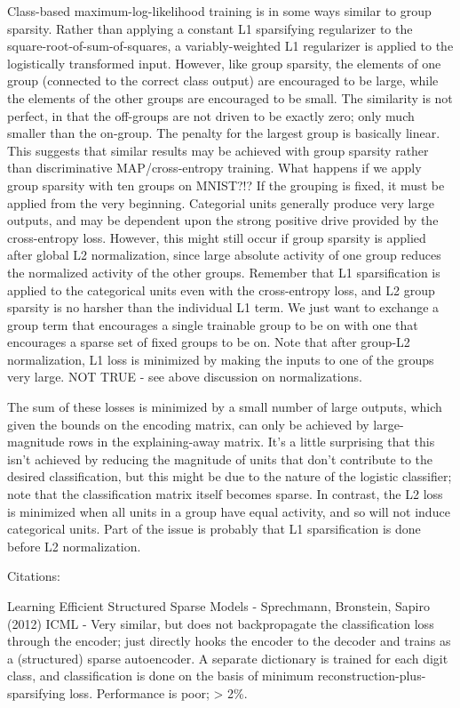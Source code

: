 Class-based maximum-log-likelihood training is in some ways similar to group sparsity.  Rather than applying a constant L1 sparsifying regularizer to the square-root-of-sum-of-squares, a variably-weighted L1 regularizer is applied to the logistically transformed input.  However, like group sparsity, the elements of one group (connected to the correct class output) are encouraged to be large, while the elements of the other groups are encouraged to be small.  The similarity is not perfect, in that the off-groups are not driven to be exactly zero; only much smaller than the on-group.  The penalty for the largest group is basically linear.  This suggests that similar results may be achieved with group sparsity rather than discriminative MAP/cross-entropy training.  What happens if we apply group sparsity with ten groups on MNIST?!?  If the grouping is fixed, it must be applied from the very beginning.  Categorial units generally produce very large outputs, and may be dependent upon the strong positive drive provided by the cross-entropy loss.  However, this might still occur if group sparsity is applied after global L2 normalization, since large absolute activity of one group reduces the normalized activity of the other groups.  Remember that L1 sparsification is applied to the categorical units even with the cross-entropy loss, and L2 group sparsity is no harsher than the individual L1 term.  We just want to exchange a group term that encourages a single trainable group to be on with one that encourages a sparse set of fixed groups to be on.  Note that after group-L2 normalization, L1 loss is minimized by making the inputs to one of the groups very large.  NOT TRUE - see above discussion on normalizations.


The sum of these losses is minimized by a small number of large outputs, which given the bounds on the encoding matrix, can only be achieved by large-magnitude rows in the explaining-away matrix.  It's a little surprising that this isn't achieved by reducing the magnitude of units that don't contribute to the desired classification, but this might be due to the nature of the logistic classifier; note that the classification matrix itself becomes sparse.  In contrast, the L2 loss is minimized when all units in a group have equal activity, and so will not induce categorical units.  Part of the issue is probably that L1 sparsification is done before L2 normalization.  




Citations:

Learning Efficient Structured Sparse Models - Sprechmann, Bronstein, Sapiro (2012) ICML - Very similar, but does not backpropagate the classification loss through the encoder; just directly hooks the encoder to the decoder and trains as a (structured) sparse autoencoder.  A separate dictionary is trained for each digit class, and classification is done on the basis of minimum reconstruction-plus-sparsifying loss.  Performance is poor; > 2\%.  

